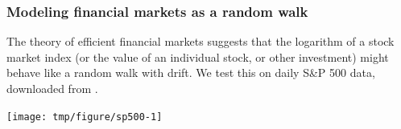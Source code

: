\begin{frame}[fragile]

\frametitle{Modeling financial markets as a random walk}


The theory of efficient financial markets suggests that the logarithm of a stock market index (or the value of an individual stock, or other investment) might behave like a random walk with drift.
We test this on daily S\&P 500 data, downloaded from .

\vspace{-1mm}

\begin{knitrout}\small
{}\color{fgcolor}\begin{kframe}
\begin{alltt}
 \hlkwb{<-} \hlstd{(}\hlstd{,}\hlstd{=}\hlstd{,}\hlstd{=}\hlstd{)}
 \hlkwb{<-} \hlopt{$}
 \hlkwb{<-} \hlopt{$}
\hlopt{~}\hlstd{=}\hlstd{,}\hlstd{=}\hlstd{,}\hlstd{=}\hlstd{,}\hlstd{=}\hlstd{)}
\end{alltt}
\end{kframe}
\end{knitrout}


\vspace{-5mm}

\begin{knitrout}\small
{}\color{fgcolor}

{\centering \texttt{[image: tmp/figure/sp500-1]} 

}


\end{knitrout}


\end{frame}


